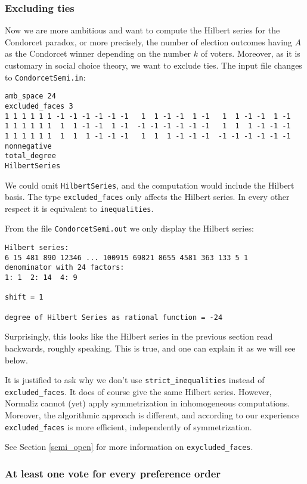 \documentclass[12pt,a4paper]{scrartcl}
\theoremstyle{definition}
\begin{document}
\subsubsection{Excluding ties}\label{excluded_ex}

Now we are more ambitious and want to compute the Hilbert series for the Condorcet paradox, or more precisely, the number of election outcomes having $A$ as the Condorcet winner depending on the number $k$ of voters. Moreover, as it is customary in social choice theory, we want to exclude ties. The input file changes to \verb|CondorcetSemi.in|:
\begin{Verbatim}
amb_space 24
excluded_faces 3
1 1 1 1 1 1 -1 -1 -1 -1 -1 -1   1  1 -1 -1  1 -1   1  1 -1 -1  1 -1
1 1 1 1 1 1  1  1 -1 -1  1 -1  -1 -1 -1 -1 -1 -1   1  1  1 -1 -1 -1
1 1 1 1 1 1  1  1  1 -1 -1 -1   1  1  1 -1 -1 -1  -1 -1 -1 -1 -1 -1
nonnegative
total_degree
HilbertSeries
\end{Verbatim}
We could omit \verb|HilbertSeries|, and the computation would include the Hilbert basis. The type \verb|excluded_faces| only affects the Hilbert series. In every other respect it is equivalent to \verb|inequalities|.

From the file \verb|CondorcetSemi.out| we only display the Hilbert series:
\begin{Verbatim}
Hilbert series:
6 15 481 890 12346 ... 100915 69821 8655 4581 363 133 5 1 
denominator with 24 factors:
1: 1  2: 14  4: 9  

shift = 1

degree of Hilbert Series as rational function = -24
\end{Verbatim}
Surprisingly, this looks like the Hilbert series in the previous section read backwards, roughly speaking. This is true, and one can explain it as we will see below. 

It is justified to ask why we don't use \verb|strict_inequalities| instead of \verb|excluded_faces|. It does of course give the same Hilbert series. However, Normaliz cannot (yet) apply symmetrization in inhomogeneous computations. Moreover, the algorithmic approach is different, and according to our experience \verb|excluded_faces| is more efficient, independently of symmetrization. 

See Section \ref{semi_open} for more information on \verb|exycluded_faces|.

\subsubsection{At least one vote for every preference order}\label{strict_signs_ex}
\end{document}
